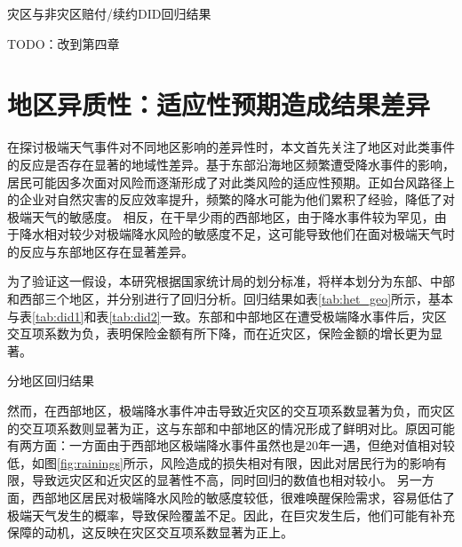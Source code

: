 \begin{table}[H]
    \centering
    \caption{灾区与非灾区赔付/续约DID回归结果}\label{tab:claims}
    
\end{table}

TODO：改到第四章
\section{地区异质性：适应性预期造成结果差异}
在探讨极端天气事件对不同地区影响的差异性时，本文首先关注了地区对此类事件的反应是否存在显著的地域性差异。基于东部沿海地区频繁遭受降水事件的影响，居民可能因多次面对风险而逐渐形成了对此类风险的适应性预期。正如台风路径上的企业对自然灾害的反应效率提升\citep{0Do}，频繁的降水可能为他们累积了经验，降低了对极端天气的敏感度\citep{陈思柳2021不同决策情境下的损失厌恶效应差异}。
相反，在干旱少雨的西部地区，由于降水事件较为罕见，由于降水相对较少对极端降水风险的敏感度不足，这可能导致他们在面对极端天气时的反应与东部地区存在显著差异。

为了验证这一假设，本研究根据国家统计局的划分标准，将样本划分为东部、中部和西部三个地区，并分别进行了回归分析。回归结果如表\ref{tab:het_geo}所示，基本与表\ref{tab:did1}和表\ref{tab:did2}一致。东部和中部地区在遭受极端降水事件后，灾区交互项系数为负，表明保险金额有所下降，而在近灾区，保险金额的增长更为显著。

\begin{table}
    \centering
    \caption{分地区回归结果}\label{tab:het_geo}
    
\end{table}

然而，在西部地区，极端降水事件冲击导致近灾区的交互项系数显著为负，而灾区的交互项系数则显著为正，这与东部和中部地区的情况形成了鲜明对比。原因可能有两方面：一方面由于西部地区极端降水事件虽然也是20年一遇，但绝对值相对较低，如图\ref{fig:rainings}所示，风险造成的损失相对有限，因此对居民行为的影响有限，导致远灾区和近灾区的显著性不高，同时回归的数值也相对较小。
另一方面，西部地区居民对极端降水风险的敏感度较低，很难唤醒保险需求，容易低估了极端天气发生的概率\citep{tversky1973availability}，导致保险覆盖不足。因此，在巨灾发生后，他们可能有补充保障的动机，这反映在灾区交互项系数显著为正上。


